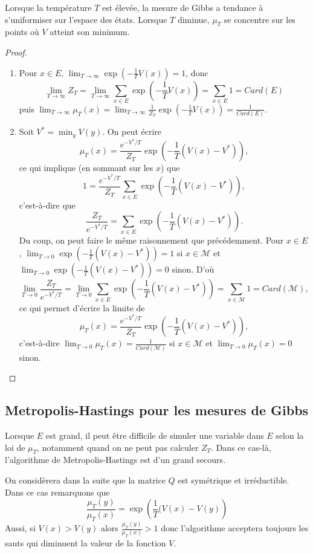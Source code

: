 \documentclass[a4paper,12pt]{book}
\begin{document}
Lorsque la température $T$ est élevée, la mesure de Gibbs a tendance à s'uniformiser sur l'espace des états. Lorsque $T$ diminue, $\mu_T$ se concentre sur les points où $V$ atteint son minimum.
\begin{proof}
\begin{enumerate}
\item Pour $x\in E$, $\displaystyle \lim_{T\to \infty} \exp\left(-\frac{1}{T}V(x)\right)=1$, donc
$$\displaystyle \lim_{T\to \infty} Z_T=\lim_{T\to \infty} \sum_{x\in E}\exp\left(-\frac{1}{T}V(x)\right)=\sum_{x\in E}1=Card(E)$$
puis $\displaystyle \lim_{T\to \infty} \mu_T(x)=\displaystyle \lim_{T\to \infty}\frac{1}{Z_T}\exp\left(-\frac{1}{T}V(x)\right)=\frac{1}{Card(E)}$.
\item Soit $V^*=\min_y V(y)$. On peut écrire
$$\mu_T(x)=\frac{e^{-V^*/T}}{Z_T}\exp\left(-\frac{1}{T}(V(x)-V^*)\right),$$
ce qui implique (en sommant sur les $x$) que
$$1=\frac{e^{-V^*/T}}{Z_T}\sum_{x\in E}\exp\left(-\frac{1}{T}(V(x)-V^*)\right),$$
c'est-à-dire que
$$\frac{Z_T}{e^{-V^*/T}}=\sum_{x\in E}\exp\left(-\frac{1}{T}(V(x)-V^*)\right).$$
Du coup, on peut faire le même raisonnement que précédemment.
Pour $x\in E$, $\displaystyle \lim_{T\to 0}\exp\left(-\frac{1}{T}(V(x)-V^*)\right)=1$ si $x\in \mathcal{M}$ et $\displaystyle \lim_{T\to 0}\exp\left(-\frac{1}{T}(V(x)-V^*)\right)=0$ sinon. D'où
$$\displaystyle \lim_{T\to 0} \frac{Z_T}{e^{-V^*/T}}=\lim_{T\to 0} \sum_{x\in E}\exp\left(-\frac{1}{T}(V(x)-V^*)\right)=\sum_{x\in \mathcal{M}}1=Card(\mathcal{M}),$$
ce qui permet d'écrire la limite de
$$\mu_T(x)=\frac{e^{-V^*/T}}{Z_T}\exp\left(-\frac{1}{T}(V(x)-V^*)\right),$$
c'est-à-dire $\displaystyle \lim_{T\to 0} \mu_T(x)=\frac{1}{Card(\mathcal{M})}$ si $x\in \mathcal{M}$ et $\displaystyle \lim_{T\to 0} \mu_T(x)=0$ sinon.
\end{enumerate}
\end{proof}
\subsection{Metropolis-Hastings pour les mesures de Gibbs}
Lorsque $E$ est grand, il peut être difficile de simuler une variable dans $E$ selon la loi de $\mu_T$, notamment quand on ne peut pas calculer $Z_T$. Dans ce cas-là, l'algorithme de Metropolis-Hastings est d'un grand secours.

On considèrera dans la suite que la matrice $Q$ est symétrique et irréductible.  Dans ce cas remarquons que $$\frac{\mu_T(y)}{\mu_T(x)}=\exp\left(\frac{1}{T}(V(x)-V(y)\right)$$
Aussi, si $V(x)>V(y)$ alors $\frac{\mu_T(y)}{\mu_T(x)}>1$ donc l'algorithme acceptera toujours les sauts qui diminuent la valeur de la fonction $V$.
\end{document}
